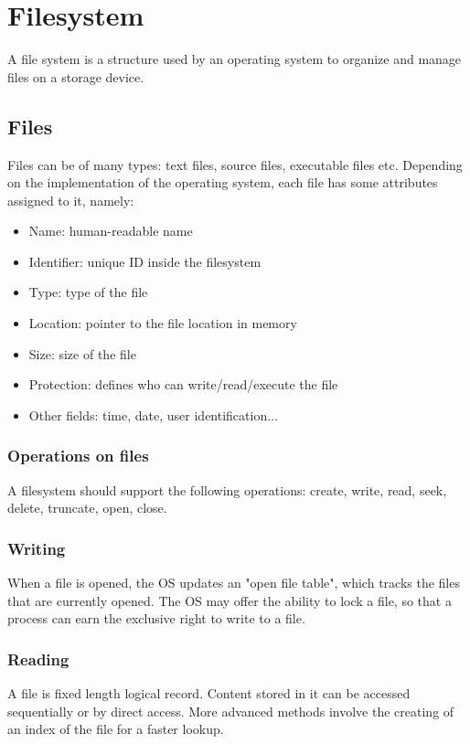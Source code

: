 \chapter{Filesystem}
A file system is a structure used by an operating system to organize and manage files on a storage device.

\section{Files}
Files can be of many types: text files, source files, executable files etc. Depending on the implementation of the operating system, each file has some attributes assigned to it, namely:
\begin{itemize}
    \item Name: human-readable name
    \item Identifier: unique ID inside the filesystem
    \item Type: type of the file
    \item Location: pointer to the file location in memory
    \item Size: size of the file
    \item Protection: defines who can write/read/execute the file
    \item Other fields: time, date, user identification...
\end{itemize}

\subsection{Operations on files}
A filesystem should support the following operations: create, write, read, seek, delete, truncate, open, close.

\subsection{Writing}
When a file is opened, the OS updates an "open file table", which tracks the files that are currently opened. The OS may offer the ability to lock a file, so that a process can earn the exclusive right to write to a file.

\subsection{Reading}
A file is fixed length logical record. Content stored in it can be accessed sequentially or by direct access. More advanced methods involve the creating of an index of the file for a faster lookup.

